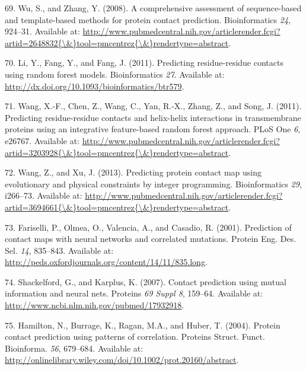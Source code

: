 \documentclass[11pt,a4paper,twoside]{book}
\theoremstyle{definition}
\theoremstyle{definition}
\theoremstyle{remark}
\begin{document}
\hypertarget{ref-Wu2008}{}
69. Wu, S., and Zhang, Y. (2008). A comprehensive assessment of
sequence-based and template-based methods for protein contact
prediction. Bioinformatics \emph{24}, 924--31. Available at:
\href{http://www.pubmedcentral.nih.gov/articlerender.fcgi?artid=2648832\%7B/\&\%7Dtool=pmcentrez\%7B/\&\%7Drendertype=abstract}{http://www.pubmedcentral.nih.gov/articlerender.fcgi?artid=2648832\{\textbackslash{}\&\}tool=pmcentrez\{\textbackslash{}\&\}rendertype=abstract}.

\hypertarget{ref-Li2011}{}
70. Li, Y., Fang, Y., and Fang, J. (2011). Predicting residue-residue
contacts using random forest models. Bioinformatics \emph{27}. Available
at: \url{http://dx.doi.org/10.1093/bioinformatics/btr579}.

\hypertarget{ref-Wang2011}{}
71. Wang, X.-F., Chen, Z., Wang, C., Yan, R.-X., Zhang, Z., and Song, J.
(2011). Predicting residue-residue contacts and helix-helix interactions
in transmembrane proteins using an integrative feature-based random
forest approach. PLoS One \emph{6}, e26767. Available at:
\href{http://www.pubmedcentral.nih.gov/articlerender.fcgi?artid=3203928\%7B/\&\%7Dtool=pmcentrez\%7B/\&\%7Drendertype=abstract}{http://www.pubmedcentral.nih.gov/articlerender.fcgi?artid=3203928\{\textbackslash{}\&\}tool=pmcentrez\{\textbackslash{}\&\}rendertype=abstract}.

\hypertarget{ref-Wang2013}{}
72. Wang, Z., and Xu, J. (2013). Predicting protein contact map using
evolutionary and physical constraints by integer programming.
Bioinformatics \emph{29}, i266--73. Available at:
\href{http://www.pubmedcentral.nih.gov/articlerender.fcgi?artid=3694661\%7B/\&\%7Dtool=pmcentrez\%7B/\&\%7Drendertype=abstract}{http://www.pubmedcentral.nih.gov/articlerender.fcgi?artid=3694661\{\textbackslash{}\&\}tool=pmcentrez\{\textbackslash{}\&\}rendertype=abstract}.

\hypertarget{ref-Fariselli2001a}{}
73. Fariselli, P., Olmea, O., Valencia, A., and Casadio, R. (2001).
Prediction of contact maps with neural networks and correlated
mutations. Protein Eng. Des. Sel. \emph{14}, 835--843. Available at:
\url{http://peds.oxfordjournals.org/content/14/11/835.long}.

\hypertarget{ref-Shackelford2007}{}
74. Shackelford, G., and Karplus, K. (2007). Contact prediction using
mutual information and neural nets. Proteins \emph{69 Suppl 8}, 159--64.
Available at: \url{http://www.ncbi.nlm.nih.gov/pubmed/17932918}.

\hypertarget{ref-Hamilton2004a}{}
75. Hamilton, N., Burrage, K., Ragan, M.A., and Huber, T. (2004).
Protein contact prediction using patterns of correlation. Proteins
Struct. Funct. Bioinforma. \emph{56}, 679--684. Available at:
\url{http://onlinelibrary.wiley.com/doi/10.1002/prot.20160/abstract}.
\end{document}
